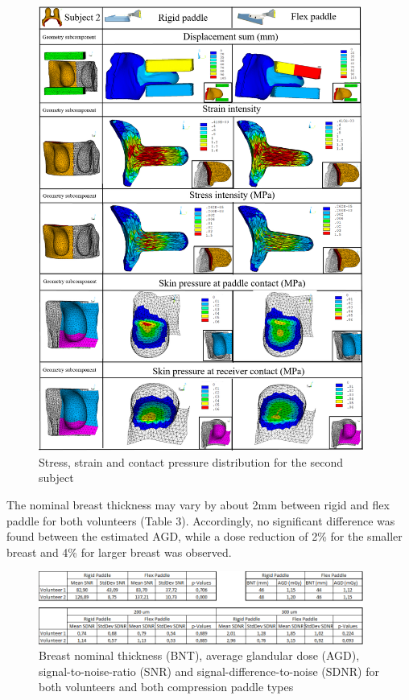 \begin{figure}[!h]
\centering
\includegraphics[width=0.95\textwidth,keepaspectratio]{figures/subject2_compressionResults.png} 
\caption{Stress, strain and contact pressure distribution for the second subject}\label{fig:subject2_compressionResults}
\end{figure}

The nominal breast thickness may vary by about 2mm between rigid and flex paddle for both volunteers (Table 3). Accordingly, no significant difference was found between the estimated AGD, while a dose reduction of 2\% for the smaller breast and 4\% for larger breast was observed.

\begin{figure}[!h]
\centering
\includegraphics[width=0.95\textwidth,keepaspectratio]{figures/table_compression_results.png} 
\caption{Breast nominal thickness (BNT), average glandular dose (AGD), signal-to-noise-ratio (SNR) and signal-difference-to-noise (SDNR) for both volunteers and both compression paddle types}\label{fig:table_compression_results}
\end{figure}

